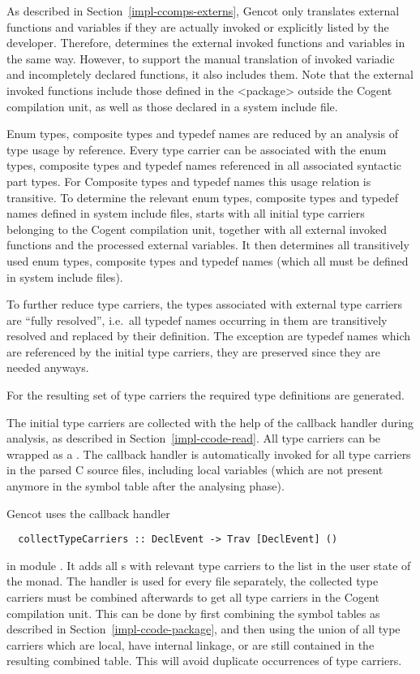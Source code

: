 As described in Section~\ref{impl-ccomps-externs}, Gencot only translates external functions and variables if they are 
actually invoked or explicitly listed by the developer.
Therefore,  determines the external invoked functions and variables in the same way. However, to support
the manual translation of invoked variadic and incompletely declared functions, it also includes them. Note that
the external invoked functions include those defined in the <package> outside the Cogent compilation unit, as well
as those declared in a system include file.

Enum types, composite types and typedef names are reduced by an analysis of type usage by reference. Every type carrier can be
associated with the enum types, composite types and typedef names referenced in all associated syntactic part types. For 
Composite types and typedef names this usage relation is transitive. To determine the relevant enum types, composite types 
and typedef names defined in system include files,  starts with all initial type carriers belonging
to the Cogent compilation unit, together with all external invoked functions and the processed external variables. 
It then determines all transitively
used enum types, composite types and typedef names (which all must be defined in system include files).

To further reduce type carriers, the types associated with external type carriers are ``fully resolved'', i.e.~all
typedef names occurring in them are transitively resolved and replaced by their definition. The exception are
typedef names which are referenced by the initial type carriers, they are preserved since they are needed anyways.

For the resulting set of type carriers the required type definitions are generated.

The initial type carriers are collected with the help of the callback handler during analysis, as described in 
Section~\ref{impl-ccode-read}. All type carriers can be wrapped as a . The callback handler 
is automatically invoked for all type carriers in the parsed
C source files, including local variables (which are not present anymore in the symbol table after the analysing phase).

Gencot uses the callback handler
\begin{verbatim}
  collectTypeCarriers :: DeclEvent -> Trav [DeclEvent] ()
\end{verbatim}
in module . It adds all s with relevant type carriers to the list in the 
user state of the  monad. The handler is used for every  file separately, the collected
type carriers must be combined afterwards to get all type carriers in the Cogent compilation unit. This can be
done by first combining the symbol tables as described in Section~\ref{impl-ccode-package}, and then using the union of all 
type carriers which are local, have internal linkage, or are still contained in the resulting combined table. 
This will avoid duplicate occurrences of type carriers.

